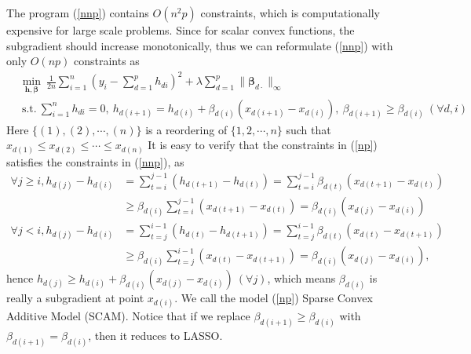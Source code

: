 \documentclass{article} %
\newcommand{\bds}[1]{\boldsymbol{#1}}
\begin{document}
The program (\ref{nnp}) contains $O(n^{2}p)$ constraints,  which is computationally expensive for large scale problems. Since for scalar convex functions, the subgradient
should increase monotonically, thus we can reformulate (\ref{nnp}) with only $O(np)$ constraints as
\begin{equation}\begin{split}\label{np}
       &\min_{\bds{h},\bds{\beta}} \ \frac{1}{2n}\sum_{i=1}^{n}(y_{i}-\sum_{d=1}^{p}h_{di})^{2} + \lambda\sum_{d=1}^{p}\|\bds{\beta}_{d\cdot}\|_{\infty} \\
       &\ \textrm{s.t.} \ \sum_{i=1}^{n}h_{di}=0, \ h_{d(i+1)} = h_{d(i)} + \beta_{d(i)}(x_{d(i+1)}-x_{d(i)}), \ \beta_{d(i+1)} \geq \beta_{d(i)} \ (\forall d, i)
\end{split}\end{equation}
Here $\{(1),(2),\cdots,(n)\}$ is a reordering of $\{1,2,\cdots,n\}$ such that $x_{d(1)}\leq{}x_{d(2)}\leq\cdots\leq{}x_{d(n)}$
It is easy to verify that the constraints in (\ref{np}) satisfies the constraints in (\ref{nnp}), as
\begin{eqnarray}
  \nonumber \forall j\geq{}i, h_{d(j)}-h_{d(i)} & = \sum\limits_{t=i}^{j-1}(h_{d(t+1)}-h_{d(t)}) = \sum\limits_{t=i}^{j-1}\beta_{d(t)}(x_{d(t+1)}-x_{d(t)})\\ \nonumber
                                                                             & \geq \beta_{d(i)}\sum\limits_{t=i}^{j-1}(x_{d(t+1)}-x_{d(t)}) = \beta_{d(i)}(x_{d(j)}-x_{d(i)}) \\
  \nonumber \forall j<i,         h_{d(j)}-h_{d(i)} &= \sum\limits_{t=j}^{i-1}(h_{d(t)}-h_{d(t+1)}) = \sum\limits_{t=j}^{i-1}\beta_{d(t)}(x_{d(t)}-x_{d(t+1)}) \\ \nonumber
                                                                             & \geq \beta_{d(i)}\sum\limits_{t=j}^{i-1}(x_{d(t)}-x_{d(t+1)}) = \beta_{d(i)}(x_{d(j)}-x_{d(i)}), 
\end{eqnarray}
hence $h_{d(j)}\geq{}h_{d(i)}+\beta_{d(i)}(x_{d(j)}-x_{d(i)}) \ (\forall j)$, which means $\beta_{d(i)}$ is really a subgradient at point $x_{d(i)}$. 
We call the model (\ref{np}) Sparse Convex Additive Model (SCAM). Notice that if we replace $\beta_{d(i+1)} \geq \beta_{d(i)}$ with
$\beta_{d(i+1)}=\beta_{d(i)}$, then it reduces to LASSO.
\end{document}
